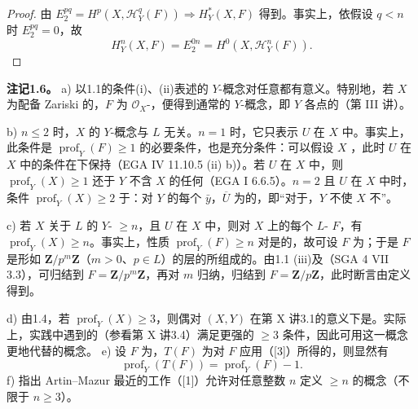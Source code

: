 \begin{proof}
由 $E_2^{pq}=H^p(X,\mathcal H_Y^q(F))\Longrightarrow H_Y^*(X,F)$ 得到。事实上，依假设 $q<n$ 时 $E_2^{pq}=0$，故
\[H_Y^n(X,F)=E_2^{0n}=H^0(X,\mathcal H_Y^n(F)).\]
\end{proof}
\textbf{注记1.6。}
a) 以1.1的条件(i)、(ii)表述的 $Y$-概念对任意都有意义。特别地，若 $X$ 为配备 Zariski 的，$F$ 为 $\mathcal O_X$-，便得到通常的 $Y$-概念，即 $Y$ 各点的（第 III 讲）。

b) $n\leq2$ 时，$X$ 的 $Y$-概念与 $L$ 无关。$n=1$ 时，它只表示 $U$ 在 $X$ 中。事实上，此条件是 $\operatorname{prof}_Y(F)\geq1$ 的必要条件，也是充分条件：可以假设 $X$ ，此时 $U$ 在 $X$ 中的条件在下保持（EGA IV 11.10.5 (ii) b)）。若 $U$ 在 $X$ 中，则 $\operatorname{prof}_Y(X)\geq1$ 还于 $Y$ 不含 $X$ 的任何（EGA I 6.6.5）。$n=2$ 且 $U$ 在 $X$ 中时，条件 $\operatorname{prof}_Y(X)\geq2$ 于：对 $Y$ 的每个 $\bar y$，$\overline U$ 为的，即“对于，$Y$ 不使 $X$ 不”。

c) 若 $X$ 关于 $L$ 的 $Y$- $\geq n$，且 $U$ 在 $X$ 中，则对 $X$ 上的每个 $L$- $F$，有 $\operatorname{prof}_Y(X)\geq n$。事实上，性质 $\operatorname{prof}_Y(F)\geq n$ 对是的，故可设 $F$ 为；于是 $F$ 是形如 $\mathbf Z/p^m\mathbf Z$（$m>0$、$p\in L$）的层的所组成的。由1.1 (iii)及（SGA 4 VII 3.3），可归结到 $F=\mathbf Z/p^m\mathbf Z$，再对 $m$ 归纳，归结到 $F=\mathbf Z/p\mathbf Z$，此时断言由定义得到。

d) 由1.4，若 $\operatorname{prof}_Y(X)\geq3$，则偶对 $(X,Y)$ 在第 X 讲3.1的意义下是。实际上，实践中遇到的（参看第 X 讲3.4）满足更强的 $\geq3$ 条件，因此可用这一概念更地代替的概念。
e) 设 $F$ 为，$T(F)$ 为对 $F$ 应用（[3]）所得的，则显然有
\[\operatorname{prof}_Y(T(F))=\operatorname{prof}_Y(F)-1.\]
f) 指出 Artin--Mazur 最近的工作（[1]）允许对任意整数 $n$ 定义 $\geq n$ 的概念（不限于 $n\geq3$）。

